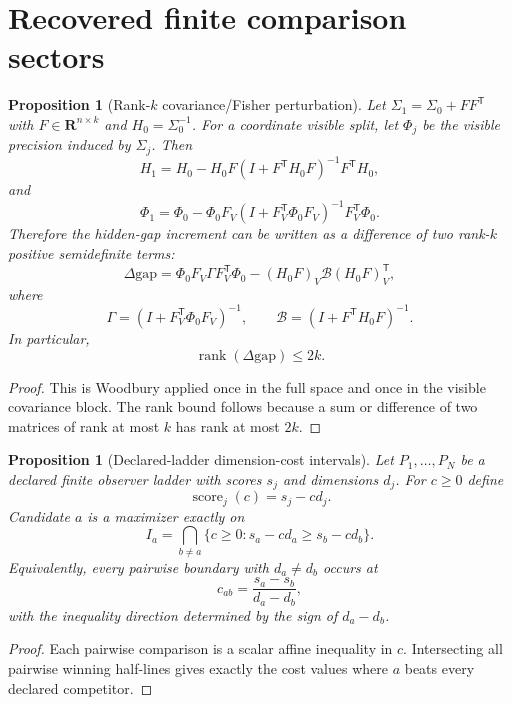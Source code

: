 \documentclass[11pt,a4paper]{article}
\numberwithin{equation}{section}
\DeclareMathOperator{\rank}{rank}
\newcommand{\R}{\mathbf R}
\theoremstyle{thmcompact}
\newtheorem{proposition}[theorem]{Proposition}
\theoremstyle{remark}
\begin{document}
\section{Recovered finite comparison sectors}

\begin{proposition}[Rank-$k$ covariance/Fisher perturbation]
Let $\Sigma_1=\Sigma_0+FF^{\mathsf T}$ with $F\in\R^{n\times k}$ and $H_0=\Sigma_0^{-1}$. For a coordinate visible split, let $\Phi_j$ be the visible precision induced by $\Sigma_j$. Then
\[
H_1=H_0-H_0F(I+F^{\mathsf T}H_0F)^{-1}F^{\mathsf T}H_0,
\]
and
\[
\Phi_1
=
\Phi_0-\Phi_0F_V(I+F_V^{\mathsf T}\Phi_0F_V)^{-1}F_V^{\mathsf T}\Phi_0.
\]
Therefore the hidden-gap increment can be written as a difference of two rank-$k$ positive semidefinite terms:
\[
\Delta \mathrm{gap}
=
\Phi_0F_V\Gamma F_V^{\mathsf T}\Phi_0
-
(H_0F)_V\mathcal B(H_0F)_V^{\mathsf T},
\]
where
\[
\Gamma=(I+F_V^{\mathsf T}\Phi_0F_V)^{-1},
\qquad
\mathcal B=(I+F^{\mathsf T}H_0F)^{-1}.
\]
In particular,
\[
\rank(\Delta\mathrm{gap})\le 2k.
\]
\end{proposition}

\begin{proof}
This is Woodbury applied once in the full space and once in the visible covariance block. The rank bound follows because a sum or difference of two matrices of rank at most $k$ has rank at most $2k$.
\end{proof}

\begin{proposition}[Declared-ladder dimension-cost intervals]
Let $P_1,\ldots,P_N$ be a declared finite observer ladder with scores $s_j$ and dimensions $d_j$. For $c\ge0$ define
\[
\operatorname{score}_j(c)=s_j-cd_j.
\]
Candidate $a$ is a maximizer exactly on
\[
I_a=\bigcap_{b\ne a}\{c\ge0:s_a-cd_a\ge s_b-cd_b\}.
\]
Equivalently, every pairwise boundary with $d_a\ne d_b$ occurs at
\[
c_{ab}=\frac{s_a-s_b}{d_a-d_b},
\]
with the inequality direction determined by the sign of $d_a-d_b$.
\end{proposition}

\begin{proof}
Each pairwise comparison is a scalar affine inequality in $c$. Intersecting all pairwise winning half-lines gives exactly the cost values where $a$ beats every declared competitor.
\end{proof}
\end{document}
